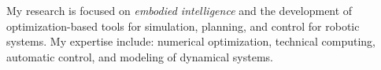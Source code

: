 

\begin{cvparagraph}

My research is focused on \textit{embodied intelligence} and the development of optimization-based tools for simulation, planning, and control for robotic systems. My expertise include: numerical optimization, technical computing, automatic control, and modeling of dynamical systems.
\end{cvparagraph}
